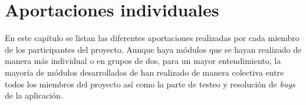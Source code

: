 \chapter{Aportaciones individuales}
\noindent
En este capítulo se listan las diferentes aportaciones realizadas por cada miembro de los participantes del proyecto. Aunque haya módulos que se hayan realizado de manera más individual o en grupos de dos, para un mayor entendimiento, la mayoría de módulos desarrollados de han realizado de manera colectiva entre todos los miembros del proyecto así como la parte de testeo y resolución de \textit{bugs} de la aplicación.




